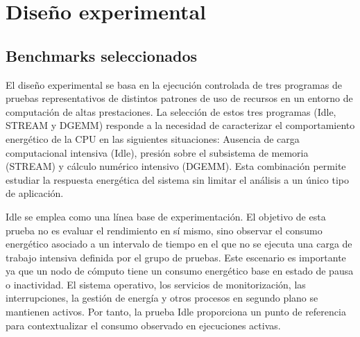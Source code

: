 \chapter{Diseño experimental}
\label{chap:diseno-experimental}

\section{Benchmarks seleccionados}
\label{sec:benchmarks-diseno-experimental}

El diseño experimental se basa en la ejecución controlada de tres programas de pruebas representativos de distintos patrones de uso de recursos en un entorno de computación de altas prestaciones. La selección de estos tres programas (Idle, STREAM y DGEMM) responde a la necesidad de caracterizar el comportamiento energético de la CPU en las siguientes situaciones: Ausencia de carga computacional intensiva (Idle), presión sobre el subsistema de memoria (STREAM) y cálculo numérico intensivo (DGEMM). Esta combinación permite estudiar la respuesta energética del sistema sin limitar el análisis a un único tipo de aplicación.

Idle se emplea como una línea base de experimentación. El objetivo de esta prueba no es evaluar el rendimiento en sí mismo, sino observar el consumo energético asociado a un intervalo de tiempo en el que no se ejecuta una carga de trabajo intensiva definida por el grupo de pruebas. Este escenario es importante ya que un nodo de cómputo tiene un consumo energético base en estado de pausa o inactividad. El sistema operativo, los servicios de monitorización, las interrupciones, la gestión de energía y otros procesos en segundo plano se mantienen activos. Por tanto, la prueba Idle proporciona un punto de referencia para contextualizar el consumo observado en ejecuciones activas.

